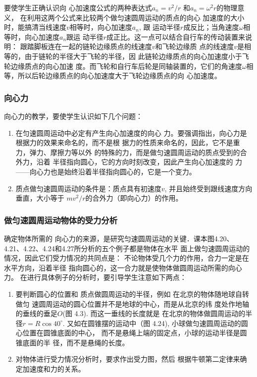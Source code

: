 要使学生正确认识向
心加速度公式的两种表达式$a_n=v^2/r$
和$a_n=\omega^2 r$的物理意义，
在利用这两个公式来比较两个做匀速圆周运动的质点的向心
加速度的大小时，能搞清当线速度$v$相等时，向心加速度$a_n$, 跟
运动半径$r$成反比；当角速度$\omega$相等时，向心加速度$a_n$跟运
动半径$r$成正比。这一点可以结合自行车的传动装置来说明：
跟踏脚板连在一起的链轮边缘质点的线速度$v$和飞轮边缘质
点的线速度$v$是相等的，由于链轮的半径大于飞轮的半径，因
此链轮边缘质点的向心加速度小于飞轮边缘质点的向心加速
度。而飞轮和自行车后轮是同轴装置的，它们的角速度$\omega$相
等，所以后轮边缘质点的向心加速度大于飞轮边缘质点的向
心加速度。

\subsubsection{向心力}

向心力的教学，要使学生认识如下几个问题：
\begin{enumerate}
\item 在匀速圆周运动中必定有产生向心加速度的向心
力。要强调指出，向心力是根据力的效果来命名的，而不是根
据力的性质来命名的，因此，它不是重力，弹力、摩擦力等以外
的特殊的力，而是做匀速圆周运动的质点受到的合外力，沿着
半径指向圆心，它的方向时刻改变，因此产生向心加速度的
力——向心力也是始终沿着半径指向圆心的，它是一个变力。
\item 质点做匀速圆周运动的条件是：质点具有初速度$v$,
并且始终受到跟线速度方向垂直，大小等于
$mv^2/r$的合外力（即向心力）的作用。
\end{enumerate}

\subsubsection{做匀速圆周运动物体的受力分析}

确定物体所需的
向心力的来源，是研究匀速圆周运动的关键．课本图4.20、
4.21、4.22、4.24和4.27所分析的五个例子都是物体在水平
面上做匀速圆周运动的情况，因此它们受力情况的共同点是：
不论物体受几个力的作用，合力一定是在水平方向，沿着半径
指向圆心的，这一合力就是使物体做圆周运动所需的向心力。
在进行具体例子的分析时，要引导学生注意如下两点：

\begin{enumerate}
\item 要判断圆心的位置和
质点做圆周运动的半径，例如
在北京的物体随地球自转做匀
速圆周运动的圆心位置并不是地球的中心，而是从北京的纬
度处作地轴的垂线的垂足$O$(图
4.3). 而这一垂线的长度就是
在北京的物体做圆周运动的半
径$r=R\cos40^{\circ}$. 又如在圆锥摆的运动中（图
4.24), 小球做匀速圆周运动的圆心位置在圆锥底面的中心，
而不是悬绳上端的固定点，小球的运动半径是圆锥底面的半
径，而不是悬绳的长度。
\item 对物体进行受力情况分析时，要求作出受力图，然后
根据牛顿第二定律来确定加速度和力的关系。
\end{enumerate}

